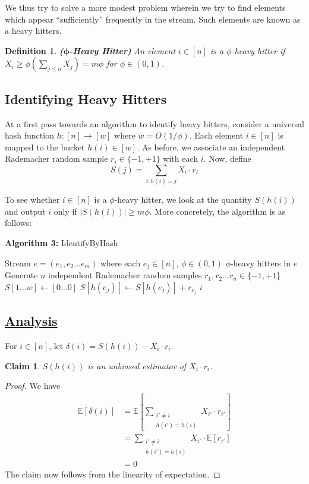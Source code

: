 \documentclass[11pt]{article}
\newtheorem{definition}{Definition}
\newtheorem{claim}{Claim}
\newcommand{\Expect}{\mathbb{E}}
\newcommand{\abs}[1]{\left| #1 \right|}
\begin{document}
\noindent We thus try to solve a more modest problem wherein we try to find  elements which appear ``sufficiently'' frequently in the stream. Such elements are known as a heavy hitters. \\

\begin{definition}
	\emph{\textbf{($\bm{\phi}$-Heavy Hitter)}}
	An element $i \in [n]$ is a $\phi$-heavy hitter if $X_i \geq \phi \left(\sum_{j \leq n} X_j\right) = m \phi$ for $\phi \in (0, 1)$.
\end{definition}

\subsection{Identifying Heavy Hitters}
At a first pass towards an algorithm to identify heavy hitters, consider a universal hash function $h : [n] \to [w]$ where $w = O(1 / \phi)$. Each element $i \in [n]$ is mapped to the bucket $h(i) \in [w]$. As before, we associate an independent Rademacher random sample $r_i \in \{-1, +1\}$ with each $i$. Now, define
\[
	S(j) = \sum_{i : h(i) = j}X_i \cdot r_i
\]

\noindent To see whether $i \in [n]$ is a $\phi$-heavy hitter, we look at the quantity $S(h(i))$ and output $i$ only if $\abs{S(h(i))} \geq m \phi$. More concretely, the algorithm is as follows:
\begin{algorithm}[H]
	\caption*{\textbf{Algorithm 3:} \mbox{\sc IdentifyByHash}}
	\begin{algorithmic}[1]
		\Input  Stream $e = (e_1, e_2 \dots e_m)$ where each $e_j \in [n]$, $\phi \in (0, 1)$
		\Output $\phi$-heavy hitters in $e$ 
		\State Generate $n$ independent Rademacher random samples $r_1, r_2 \dots r_n \in \{-1, +1\}$ 
		\State $S[1 \dots w] \gets [0 \dots 0]$
		\State $S[h(e_j)] \gets S[h(e_j)] + r_{e_j}$
		\EndFor
			\If{$\abs{S(h(i))} \geq m \phi$}
				\OutputS $i$
			\EndIf
		\EndFor
	\end{algorithmic}
\end{algorithm}

\subsection*{\underline{Analysis}}
For $i \in [n]$, let $\delta(i) = S(h(i)) - X_i \cdot r_i$.

\begin{claim}
	$S(h(i))$ is an unbiased estimator of $X_i \cdot r_i$. 
\end{claim}
\begin{proof}
We have
\begin{align*}
\Expect[\delta(i)] &= \Expect \left[\sum_{\substack{i' \neq i \\h(i') = h(i)}} X_{i'} \cdot r_{i'}\right] \\[5pt]
&= \sum_{\substack{i' \neq i \\h(i') = h(i)}} X_{i'} \cdot \Expect[r_{i'}] \\[5pt]
&= 0
\end{align*}
The claim now follows from the linearity of expectation.
\end{proof}

\newpage	
\nocite{*}


\end{document}
